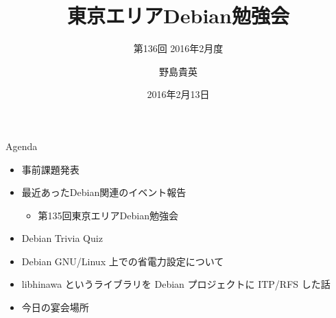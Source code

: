 \title{東京エリアDebian勉強会}
\subtitle{第136回 2016年2月度}
\author{野島貴英}
\date{2016年2月13日}



\begin{frame}
\titlepage{}
\end{frame}

\begin{frame}{Agenda}
 \begin{minipage}[t]{0.45\hsize}
  \begin{itemize}
   \item 事前課題発表
   \item 最近あったDebian関連のイベント報告
	 \begin{itemize}
	 \item 第135回東京エリアDebian勉強会
	 \end{itemize}
  \end{itemize}
 \end{minipage} 
 \begin{minipage}[t]{0.45\hsize}
  \begin{itemize}
   \item Debian Trivia Quiz
   \item Debian GNU/Linux 上での省電力設定について
   \item libhinawa というライブラリを Debian プロジェクトに ITP/RFS した話
   \item 今日の宴会場所
  \end{itemize}
 \end{minipage}
\end{frame}


